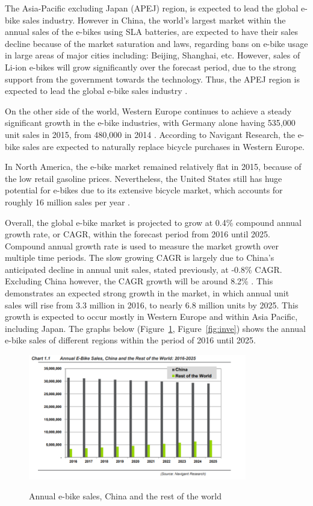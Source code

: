 \documentclass[a4paper,11pt]{article}
\begin{document}
The Asia-Pacific excluding Japan (APEJ) region, is expected to lead the global e-bike sales industry. However in China, the world's largest market within the annual sales of the e-bikes using SLA batteries, are expected to have their sales decline because of the market saturation and laws, regarding bans on e-bike usage in large areas of major cities including: Beijing, Shanghai, etc. However, sales of Li-ion e-bikes will grow significantly over the forecast period, due to the strong support from the government towards the technology. Thus, the APEJ region is expected to lead the global e-bike sales industry \cite{citron16}.

On the other side of the world, Western Europe continues to achieve a steady significant growth in the e-bike industries, with Germany alone having 535,000 unit sales in 2015, from 480,000 in 2014 \cite{citron16}. According to Navigant Research, the e-bike sales are expected to naturally replace bicycle purchases in Western Europe.

In North America, the e-bike market remained relatively flat in 2015, because of the low retail gasoline prices. Nevertheless, the United States still has huge potential for e-bikes due to its extensive bicycle market, which accounts for roughly 16 million sales per year \cite{citron16}.

Overall, the global e-bike market is projected to grow at 0.4\% compound annual growth rate, or CAGR, within the forecast period from 2016 until 2025. Compound annual growth rate is used to measure the market growth over multiple time periods. The slow growing CAGR is largely due to China's anticipated decline in annual unit sales, stated previously, at -0.8\% CAGR. Excluding China however, the CAGR growth will be around 8.2\% \cite{citron16}. This demonstrates an expected strong growth in the market, in which annual unit sales will rise from 3.3 million in 2016, to nearly 6.8 million units by 2025. This growth is expected to occur mostly in Western Europe and within Asia Pacific, including Japan. The graphs below (Figure~\ref{fig:crw}, Figure~\ref{fig:inve}) shows the annual e-bike sales of different regions within the period of 2016 until 2025.

\begin{figure}[!ht]
	\centering
	\includegraphics[width=0.85\textwidth]{ebsale}
	\caption{Annual e-bike sales, China and the rest of the world}
	\cite{citron16}
	\label{fig:crw}
\end{figure}
\end{document}
